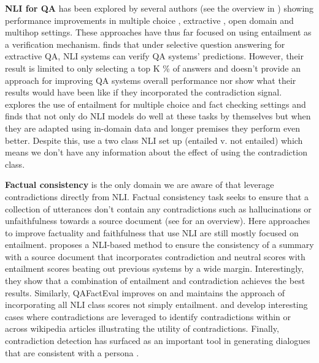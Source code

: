 \documentclass[11pt]{article}
\begin{document}
\textbf{NLI for QA} has been explored by several authors (see the overview in \citet{paramasivam_survey_2021}) showing performance improvements in multiple choice \citep{mishra_looking_2021}, extractive \citep{chen_can_2021}, open domain \citep{harabagiu_methods_2006} and multihop \citep{trivedi_repurposing_2019} settings. These approaches have thus far focused on using entailment as a verification mechanism. \citet{chen_can_2021} finds that under selective question answering \citep{kamath_selective_2020} for extractive QA, NLI systems can verify QA systems’ predictions. However, their result is limited to only selecting a top K \% of answers and doesn’t provide an approach for improving QA systems overall performance nor show what their results would have been like if they incorporated the contradiction signal. \citet{mishra_looking_2021} explores the use of entailment for multiple choice and fact checking settings and finds that not only do NLI models do well at these tasks by themselves but when they are adapted using in-domain data and longer premises they perform even better. Despite this, \citet{mishra_looking_2021} use a two class NLI set up (entailed v. not entailed) which means we don’t have any information about the effect of using the contradiction class.

\textbf{Factual consistency} is the only domain we are aware of that leverage contradictions directly from NLI. Factual consistency task seeks to ensure that a collection of utterances don't contain any contradictions such as hallucinations or unfaithfulness towards a source document (see \citet{li_faithfulness_2022} for an overview). Here approaches to improve factuality and faithfulness that use NLI are still mostly focused on entailment. \citet{laban_summac_2022} proposes a NLI-based method to ensure the consistency of a summary with a source document that incorporates contradiction and neutral scores with entailment scores beating out previous systems by a wide margin. Interestingly, they show that a combination of entailment and contradiction achieves the best results. Similarly, QAFactEval \citep{fabbri_qafacteval_2022} improves on \citet{laban_summac_2022} and maintains the approach of incorporating all NLI class scores not simply entailment. \citet{schuster_stretching_2022} and \citet{hsu_wikicontradiction_2021} develop interesting cases where contradictions are leveraged to identify contradictions within or across wikipedia articles illustrating the utility of contradictions. Finally, contradiction detection has surfaced as an important tool in generating dialogues that are consistent with a persona \citep{nie_i_2021, song_generating_2020}.
\end{document}
